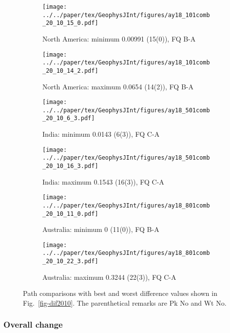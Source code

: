\begin{figure*}
	\centering
	\begin{subfigure}{.43\textwidth}
		\texttt{[image: ../../paper/tex/GeophysJInt/figures/ay18\_101comb\_20\_10\_15\_0.pdf]}
		\caption{North America: minimum 0.00991 (15(0)), FQ B-A}
	\end{subfigure}
	\begin{subfigure}{.43\textwidth}
		\texttt{[image: ../../paper/tex/GeophysJInt/figures/ay18\_101comb\_20\_10\_14\_2.pdf]}
		\caption{North America: maximum 0.0654 (14(2)), FQ B-A}
	\end{subfigure}
	\vspace{.1em}
	\begin{subfigure}{.43\textwidth}
		\texttt{[image: ../../paper/tex/GeophysJInt/figures/ay18\_501comb\_20\_10\_6\_3.pdf]}
		\caption{India: minimum 0.0143 (6(3)), FQ C-A}
	\end{subfigure}
	\begin{subfigure}{.43\textwidth}
		\texttt{[image: ../../paper/tex/GeophysJInt/figures/ay18\_501comb\_20\_10\_16\_3.pdf]}
		\caption{India: maximum 0.1543 (16(3)), FQ C-A}
	\end{subfigure}
	\vspace{.1em}
	\begin{subfigure}{.43\textwidth}
		\texttt{[image: ../../paper/tex/GeophysJInt/figures/ay18\_801comb\_20\_10\_11\_0.pdf]}
		\caption{Australia: minimum 0 (11(0)), FQ B-A}\label{fig-au-2010110}
	\end{subfigure}
	\begin{subfigure}{.43\textwidth}
		\texttt{[image: ../../paper/tex/GeophysJInt/figures/ay18\_801comb\_20\_10\_22\_3.pdf]}
		\caption{Australia: maximum 0.3244 (22(3)), FQ C-A}\label{fig-au-2010223}
	\end{subfigure}
	\caption[Best and worst differences (20 Myr bin, 10 Myr step)]{Path
comparisons with best and worst difference values shown in
Fig.~\ref{fig-dif2010}. The parenthetical remarks are Pk No and Wt
No.}\label{fig-dif2010bw}
\end{figure*}

\subsubsection{Overall change}

